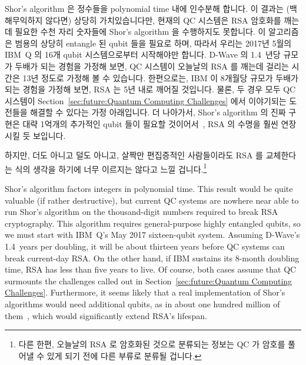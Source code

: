 Shor's algorithm 은 정수들을 polynomial time 내에 인수분해 합니다.
이 결과는 (백해무익하지 않다면) 상당히 가치있습니다만, 현재의 QC 시스템은 RSA
암호화를 깨는데 필요한 수천 자리 숫자들에 Shor's algorithm 을 수행하지도
못합니다.
이 알고리즘은 범용의 상당히 entangle 된 qubit 들을 필요로 하며, 따라서 우리는
2017년 5월의 IBM~Q 의 16개 qubit 시스템으로부터 시작해야만 합니다.
D-Wave 의 1.4~년당 규모가 두배가 되는 경험을 가정해 보면, QC 시스템이 오늘날의
RSA 를 깨는데 걸리는 시간은 13년 정도로 가정해 볼 수 있습니다.
한편으로는, IBM 이 8개월당 규모가 두배가 되는 경험을 가정해 보면, RSA 는 5년
내로 깨어질 것입니다.
물론, 두 경우 모두 QC 시스템이
Section~\ref{sec:future:Quantum Computing Challenges} 에서 이야기되는 도전들을
해결할 수 있다는 가정 아래입니다.
더 나아가서, Shor's algorithm 의 진짜 구현은 대략 1억개의 추가적인 qubit 들이
필요할 것이어서~\cite{RachelCourtland2017GoogleQC}, RSA 의 수명을 훨씬 연장시킬
듯 보입니다.

하지만, 더도 아니고 덜도 아니고, 살짝만 편집증적인 사람들이라도 RSA 를
교체한다는 식의 생각을 하기에 너무 이르지는 않다고 느낄 겁니다.\footnote{
	다른 한편, 오늘날의 RSA 로 암호화된 것으로 분류되는 정보는 QC 가 암호를
	풀어낼 수 있게 되기 전에 다른 부류로 분류될 겁니다.}
\iffalse

Shor's algorithm factors integers in polynomial time.
This result would be quite valuable (if rather destructive),
but current QC systems are nowhere near able to run
Shor's algorithm on the thousand-digit numbers required
to break RSA cryptography.
This algorithm requires general-purpose highly entangled qubits,
so we must start with IBM~Q's May 2017 sixteen-qubit system.
Assuming D-Wave's 1.4~years per doubling, it will be about thirteen
years before QC systems can break current-day RSA.
On the other hand, if IBM sustains its 8-month doubling time, RSA has
less than five years to live.
Of course, both cases assume that QC surmounts the challenges called
out in Section~\ref{sec:future:Quantum Computing Challenges}.
Furthermore, it seems likely that a real implementation of Shor's
algorithms would need additional qubits, as in about one hundred
million of them~\cite{RachelCourtland2017GoogleQC},
which would significantly extend RSA's lifespan.

